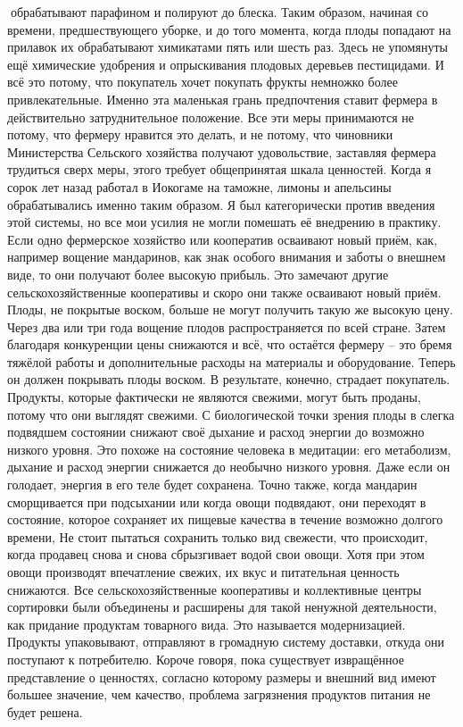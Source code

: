 \documentclass[a4paper]{book}
\begin{document}
обрабатывают парафином и полируют до блеска.
Таким образом, начиная со времени, предшествующего уборке, и до того момента, когда
плоды попадают на прилавок их обрабатывают химикатами пять или шесть раз. Здесь не
упомянуты ещё химические удобрения и опрыскивания плодовых деревьев пестицидами. И
всё это потому, что покупатель хочет покупать фрукты немножко более привлекательные.
Именно эта маленькая грань предпочтения ставит фермера в действительно затруднительное
положение.
Все эти меры принимаются не потому, что фермеру нравится это делать, и не потому,
что чиновники Министерства Сельского хозяйства получают удовольствие, заставляя
фермера трудиться сверх меры, этого требует общепринятая шкала ценностей.
Когда я сорок лет назад работал в Иокогаме на таможне, лимоны и апельсины
обрабатывались именно таким образом. Я был категорически против введения этой системы,
но все мои усилия не могли помешать её внедрению в практику.
Если одно фермерское хозяйство или кооператив осваивают новый приём, как,
например вощение мандаринов, как знак особого внимания и заботы о внешнем виде, то они
получают более высокую прибыль. Это замечают другие сельскохозяйственные кооперативы
и скоро они также осваивают новый приём. Плоды, не покрытые воском, больше не могут
получить такую же высокую цену. Через два или три года вощение плодов распространяется
по всей стране. Затем благодаря конкуренции цены снижаются и всё, что остаётся фермеру –
это бремя тяжёлой работы и дополнительные расходы на материалы и оборудование. Теперь
он должен покрывать плоды воском.
В результате, конечно, страдает покупатель. Продукты, которые фактически не являются
свежими, могут быть проданы, потому что они выглядят свежими. С биологической точки
зрения плоды в слегка подвядшем состоянии снижают своё дыхание и расход энергии до
возможно низкого уровня. Это похоже на состояние человека в медитации: его метаболизм,
дыхание и расход энергии снижается до необычно низкого уровня. Даже если он голодает,
энергия в его теле будет сохранена. Точно также, когда мандарин сморщивается при
подсыхании или когда овощи подвядают, они переходят в состояние, которое сохраняет их
пищевые качества в течение возможно долгого времени,
Не стоит пытаться сохранить только вид свежести, что происходит, когда продавец снова
и снова сбрызгивает водой свои овощи. Хотя при этом овощи производят впечатление
свежих, их вкус и питательная ценность снижаются.
Все сельскохозяйственные кооперативы и коллективные центры сортировки были
объединены и расширены для такой ненужной деятельности, как придание продуктам
товарного вида. Это называется модернизацией. Продукты упаковывают, отправляют в
громадную систему доставки, откуда они поступают к потребителю.
Короче говоря, пока существует извращённое представление о ценностях, согласно
которому размеры и внешний вид имеют большее значение, чем качество, проблема
загрязнения продуктов питания не будет решена.
\end{document}
